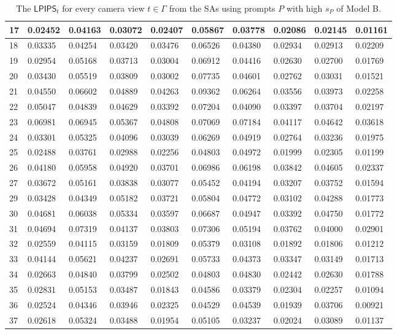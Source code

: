 \begin{table}[H]
{\begin{tabular}{|l|l|l|l|l|l|l|l|l|l|}
        17 & 0.02452 & 0.04163 & 0.03072 & 0.02407 & 0.05867 & 0.03778 & 0.02086 & 0.02145 & 0.01161 \\ \hline
        18 & 0.03335 & 0.04254 & 0.03420 & 0.03476 & 0.06526 & 0.04380 & 0.02934 & 0.02913 & 0.02209 \\ \hline
        19 & 0.02954 & 0.05168 & 0.03713 & 0.03004 & 0.06912 & 0.04416 & 0.02630 & 0.02700 & 0.01769 \\ \hline
        20 & 0.03430 & 0.05519 & 0.03809 & 0.03002 & 0.07735 & 0.04601 & 0.02762 & 0.03031 & 0.01521 \\ \hline
        21 & 0.04550 & 0.06602 & 0.04889 & 0.04263 & 0.09362 & 0.06264 & 0.03556 & 0.03973 & 0.02258 \\ \hline
        22 & 0.05047 & 0.04839 & 0.04629 & 0.03392 & 0.07204 & 0.04090 & 0.03397 & 0.03704 & 0.02197 \\ \hline
        23 & 0.06981 & 0.06945 & 0.05367 & 0.04808 & 0.07069 & 0.07184 & 0.04117 & 0.04642 & 0.03618 \\ \hline
        24 & 0.03301 & 0.05325 & 0.04096 & 0.03039 & 0.06269 & 0.04919 & 0.02764 & 0.03236 & 0.01975 \\ \hline
        25 & 0.02488 & 0.03761 & 0.02988 & 0.02256 & 0.04803 & 0.04972 & 0.01999 & 0.02305 & 0.01199 \\ \hline
        26 & 0.04180 & 0.05958 & 0.04920 & 0.03701 & 0.06986 & 0.06198 & 0.03842 & 0.04605 & 0.02337 \\ \hline
        27 & 0.03672 & 0.05161 & 0.03838 & 0.03077 & 0.05452 & 0.04194 & 0.03207 & 0.03752 & 0.01594 \\ \hline
        29 & 0.03428 & 0.04349 & 0.05182 & 0.03721 & 0.05804 & 0.04772 & 0.03102 & 0.04288 & 0.01773 \\ \hline
        30 & 0.04681 & 0.06038 & 0.05334 & 0.03597 & 0.06687 & 0.04947 & 0.03392 & 0.04750 & 0.01772 \\ \hline
        31 & 0.04694 & 0.07319 & 0.04137 & 0.03803 & 0.07306 & 0.05194 & 0.03762 & 0.04000 & 0.02901 \\ \hline
        32 & 0.02559 & 0.04115 & 0.03159 & 0.01809 & 0.05379 & 0.03108 & 0.01892 & 0.01806 & 0.01212 \\ \hline
        33 & 0.04144 & 0.05621 & 0.04237 & 0.02691 & 0.05733 & 0.04373 & 0.03347 & 0.03149 & 0.01713 \\ \hline
        34 & 0.02663 & 0.04840 & 0.03799 & 0.02502 & 0.04803 & 0.04830 & 0.02442 & 0.02630 & 0.01788 \\ \hline
        35 & 0.02831 & 0.05153 & 0.03487 & 0.01843 & 0.04586 & 0.03379 & 0.02304 & 0.02257 & 0.01094 \\ \hline
        36 & 0.02524 & 0.04346 & 0.03946 & 0.02325 & 0.04529 & 0.04539 & 0.01939 & 0.03706 & 0.00921 \\ \hline
        37 & 0.02618 & 0.05324 & 0.03488 & 0.01954 & 0.05105 & 0.03237 & 0.02024 & 0.03089 & 0.01137 \\ \hline
    \end{tabular}}
	\caption{The $ \mathsf{LPIPS}_t$ for every camera view $t \in \varGamma$ from the SAs using prompts $P$ with high $s_P$ of Model B.}


\end{table}
